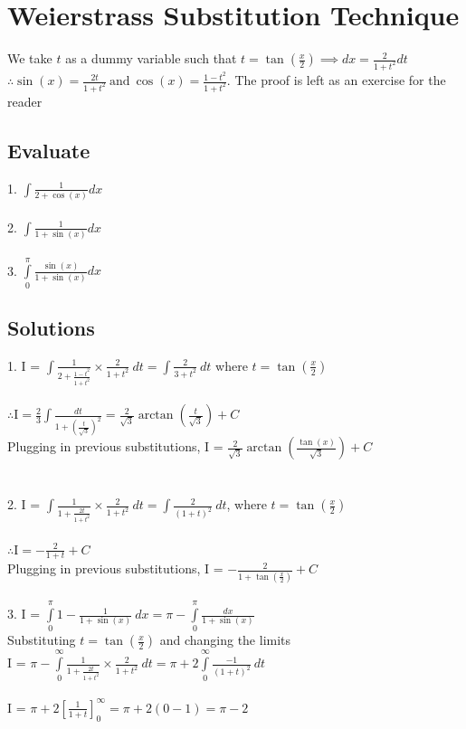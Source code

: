 \documentclass[14pt]{article}
\begin{document}
	\section{Weierstrass Substitution Technique}
	We take $t$ as a dummy variable such that $\displaystyle t = \tan\left(\frac{x}{2}\right) \implies dx = \frac{2}{1+t^2}dt$ \\
	$\displaystyle \therefore \sin(x) = \frac{2t}{1+t^2} \ \text{and} \ \cos(x) = \frac{1-t^2}{1+t^2}$. The proof is left as an exercise for the reader
	\subsection{Evaluate}
	1. $\displaystyle \int \frac{1}{2+\cos(x)}dx$ \\ \\
	2. $\displaystyle \int \frac{1}{1+\sin(x)}dx$ \\ \\
	3. $\displaystyle \int \limits_0^\pi \frac{\sin(x)}{1+\sin(x)}dx$
	\subsection{Solutions}
	1. I = $\displaystyle \int \frac{1}{2+\frac{1-t^2}{1+t^2}} \times \frac{2}{1+t^2} \ dt = \int \frac{2}{3+t^2} \ dt$ where $t = \tan(\frac{x}{2})$ \\ \\
	$\displaystyle \therefore \text{I} = \frac{2}{3} \int \frac{dt}{1+\left(\frac{t}{\sqrt{3}}\right)^2} = \frac{2}{\sqrt{3}}\arctan\left(\frac{t}{\sqrt{3}}\right) + C$ \\
	Plugging in previous substitutions,
	I = $\displaystyle \boxed{\frac{2}{\sqrt{3}} \arctan\left(\frac{\tan(x)}{\sqrt{3}}\right)+C}$ \\ \\ \\
	2. I = $\displaystyle \int \frac{1}{1+\frac{2t}{1+t^2}} \times \frac{2}{1+t^2} \ dt = \int \frac{2}{(1+t)^2} \ dt$, where $t = \tan(\frac{x}{2})$ \\ \\
	$\displaystyle \therefore \text{I} = -\frac{2}{1+t}+C$ \\
	Plugging in previous substitutions,
	I = $\displaystyle \boxed{-\frac{2}{1+\tan(\frac{x}{2})}+C}$ \\ \\
	3. I = $\displaystyle \int \limits_0^\pi 1-\frac{1}{1+\sin(x)} \ dx = \pi - \int \limits_0^\pi \frac{dx}{1+\sin(x)}$ \\
	Substituting $\displaystyle t = \tan\left(\frac{x}{2}\right)$ and changing the limits\\
	I = $\displaystyle \pi - \int \limits_0^\infty \frac{1}{1+\frac{2t}{1+t^2}} \times \frac{2}{1+t^2} \ dt = \pi + 2 \int \limits_0^\infty \frac{-1}{(1+t)^2} \ dt$ \\ \\
	I = $\displaystyle \pi + 2 \left[\frac{1}{1+t}\right]_0^\infty = \pi + 2(0-1) = \boxed{\pi-2}$
\end{document}
